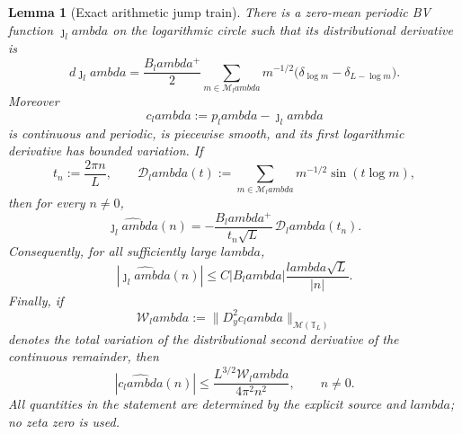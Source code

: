 \documentclass[11pt]{article}
\def\lambda{lambda}%
\newtheorem{lemma}[theorem]{Lemma}
\theoremstyle{remark}
\begin{document}
\begin{lemma}[Exact arithmetic jump train]\label{lem:g1-jump-train}
There is a zero-mean periodic BV function $\jmath_\lambda$ on the logarithmic
circle such that its distributional derivative is
\begin{equation}\label{eq:g1-jump-measure}
 d\jmath_\lambda
 =\frac{B_\lambda^{+}}2
 \sum_{m\in\mathcal M_\lambda}m^{-1/2}
 \bigl(\delta_{\log m}-\delta_{L-\log m}\bigr).
\end{equation}
Moreover
\[
 c_\lambda:=p_\lambda-\jmath_\lambda
\]
is continuous and periodic, is piecewise smooth, and its first logarithmic
derivative has bounded variation.  If
\[
 t_n:=\frac{2\pi n}{L},\qquad
 \mathcal D_\lambda(t):=
 \sum_{m\in\mathcal M_\lambda}m^{-1/2}\sin(t\log m),
\]
then for every $n\ne0$,
\begin{equation}\label{eq:g1-jump-fourier-exact}
 \boxed{
 \widehat{\jmath_\lambda}(n)
 =-\frac{B_\lambda^{+}}{t_n\sqrt L}\,
 \mathcal D_\lambda(t_n).}
\end{equation}
Consequently, for all sufficiently large $\lambda$,
\begin{equation}\label{eq:g1-jump-fourier-trivial}
 \boxed{
 |\widehat{\jmath_\lambda}(n)|
 \le C|B_\lambda|\frac{\lambda\sqrt L}{|n|}.}
\end{equation}
Finally, if
\[
 \mathcal W_\lambda
 :=\bigl\|D_y^2c_\lambda\bigr\|_{\mathcal M(\mathbb T_L)}
\]
denotes the total variation of the distributional second derivative of the
continuous remainder, then
\begin{equation}\label{eq:g1-continuous-fourier}
 \boxed{
 |\widehat{c_\lambda}(n)|
 \le \frac{L^{3/2}\mathcal W_\lambda}{4\pi^2n^2},
 \qquad n\ne0.}
\end{equation}
All quantities in the statement are determined by the explicit source and
$\lambda$; no zeta zero is used.
\end{lemma}
\end{document}
